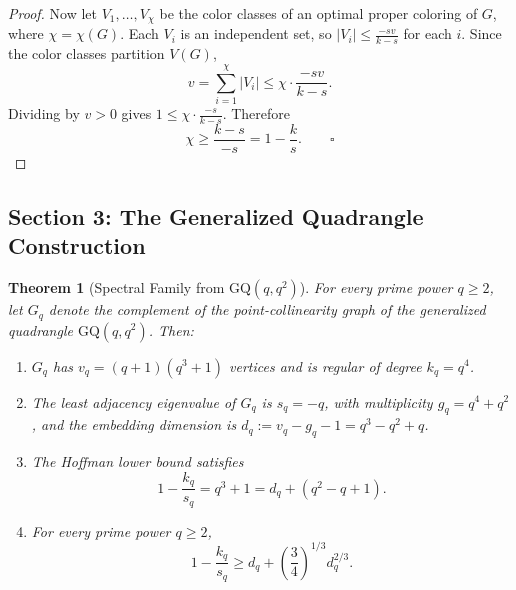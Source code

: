 \documentclass{article}
\newtheorem{theorem}{Theorem}[section]
\theoremstyle{definition}
\begin{document}
\begin{proof}
Now let $V_{1},\dots,V_{\chi}$ be the color classes of an optimal proper coloring of $G$, where $\chi=\chi(G)$. Each $V_{i}$ is an independent set, so $|V_{i}|\le \frac{-sv}{k-s}$ for each $i$. Since the color classes partition $V(G)$,
\[
v=\sum_{i=1}^{\chi}|V_{i}|\le\chi\cdot\frac{-sv}{k-s}.
\]
Dividing by $v>0$ gives $1\le \chi\cdot\frac{-s}{k-s}$. Therefore
\[
\chi\ge\frac{k-s}{-s}=1-\frac{k}{s}.\qquad\square
\]
\end{proof}

\subsection*{Section 3: The Generalized Quadrangle Construction}

\begin{theorem}[Spectral Family from $\mathrm{GQ}(q,q^2)$]
\label{thm:gq-family}
For every prime power $q\ge 2$, let $G_q$ denote the complement of the point-collinearity graph of the generalized quadrangle $\mathrm{GQ}(q,q^2)$. Then:
\begin{enumerate}
  \item $G_q$ has $v_q=(q+1)(q^3+1)$ vertices and is regular of degree $k_q=q^4$.
  \item The least adjacency eigenvalue of $G_q$ is $s_q=-q$, with multiplicity $g_q=q^4+q^2$, and the embedding dimension is $d_q:=v_q-g_q-1=q^3-q^2+q$.
  \item The Hoffman lower bound satisfies
    \[1-\frac{k_q}{s_q}=q^3+1=d_q+(q^2-q+1).\]
  \item For every prime power $q\ge 2$,
    \[1-\frac{k_q}{s_q}\ge d_q+\left(\frac{3}{4}\right)^{1/3}d_q^{2/3}.\]
\end{enumerate}
\end{theorem}
\end{document}
